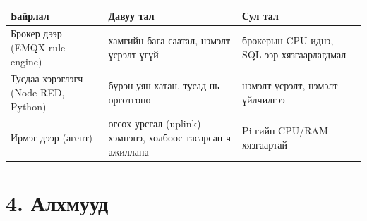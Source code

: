 \begingroup\scriptsize\begin{longtable}[]{@{}lll@{}}
\toprule
\begin{minipage}[b]{0.30\columnwidth}\raggedright
Байрлал\strut
\end{minipage} & \begin{minipage}[b]{0.30\columnwidth}\raggedright
Давуу тал\strut
\end{minipage} & \begin{minipage}[b]{0.30\columnwidth}\raggedright
Сул тал\strut
\end{minipage}\tabularnewline
\midrule
\endhead
\begin{minipage}[t]{0.30\columnwidth}\raggedright
Брокер дээр (EMQX rule engine)\strut
\end{minipage} & \begin{minipage}[t]{0.30\columnwidth}\raggedright
хамгийн бага саатал, нэмэлт үсрэлт үгүй\strut
\end{minipage} & \begin{minipage}[t]{0.30\columnwidth}\raggedright
брокерын CPU иднэ, SQL-ээр хязгаарлагдмал\strut
\end{minipage}\tabularnewline
\begin{minipage}[t]{0.30\columnwidth}\raggedright
Тусдаа хэрэглэгч (Node-RED, Python)\strut
\end{minipage} & \begin{minipage}[t]{0.30\columnwidth}\raggedright
бүрэн уян хатан, тусад нь өргөтгөнө\strut
\end{minipage} & \begin{minipage}[t]{0.30\columnwidth}\raggedright
нэмэлт үсрэлт, нэмэлт үйлчилгээ\strut
\end{minipage}\tabularnewline
\begin{minipage}[t]{0.30\columnwidth}\raggedright
Ирмэг дээр (агент)\strut
\end{minipage} & \begin{minipage}[t]{0.30\columnwidth}\raggedright
өгсөх урсгал (uplink) хэмнэнэ, холбоос тасарсан ч ажиллана\strut
\end{minipage} & \begin{minipage}[t]{0.30\columnwidth}\raggedright
Pi-гийн CPU/RAM хязгаартай\strut
\end{minipage}\tabularnewline
\bottomrule
\end{longtable}\endgroup

\hypertarget{ux430ux43bux445ux43cux443ux443ux434}{%
\section{4. Алхмууд}\label{ux430ux43bux445ux43cux443ux443ux434}}

